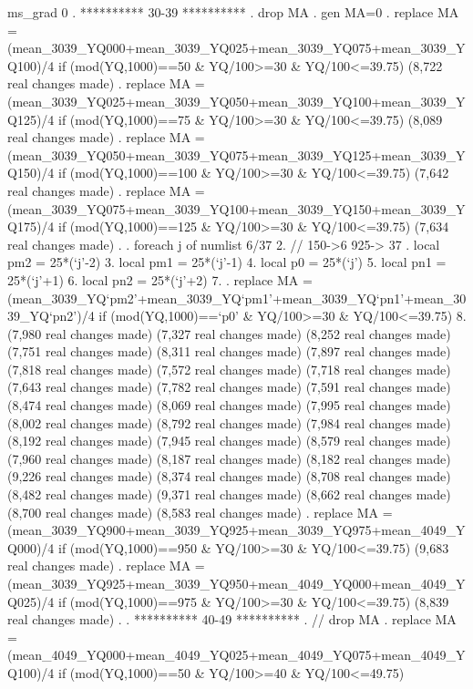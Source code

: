      ms_grad {\VBAR}          0
{\smallskip}
. **********  30-39 **********
. drop MA
{\smallskip}
. gen MA=0
{\smallskip}
. replace MA = (mean_3039_YQ000+mean_3039_YQ025+mean_3039_YQ075+mean_3039_YQ100)/4 if (mod(YQ,1000)==50 \& YQ/100>=30 \& YQ/100<=39.75)
(8,722 real changes made)
{\smallskip}
. replace MA = (mean_3039_YQ025+mean_3039_YQ050+mean_3039_YQ100+mean_3039_YQ125)/4 if (mod(YQ,1000)==75 \& YQ/100>=30 \& YQ/100<=39.75)
(8,089 real changes made)
{\smallskip}
. replace MA = (mean_3039_YQ050+mean_3039_YQ075+mean_3039_YQ125+mean_3039_YQ150)/4 if (mod(YQ,1000)==100 \& YQ/100>=30 \& YQ/100<=39.75)
(7,642 real changes made)
{\smallskip}
. replace MA = (mean_3039_YQ075+mean_3039_YQ100+mean_3039_YQ150+mean_3039_YQ175)/4 if (mod(YQ,1000)==125 \& YQ/100>=30 \& YQ/100<=39.75)
(7,634 real changes made)
{\smallskip}
. 
. foreach j of numlist 6/37{\lbr}
  2.         // 150->6 925-> 37
.         local pm2 = 25*(`j'-2)
  3.         local pm1 = 25*(`j'-1)
  4.         local p0 = 25*(`j')
  5.         local pn1 = 25*(`j'+1)
  6.         local pn2 = 25*(`j'+2)
  7. 
.         replace MA = (mean_3039_YQ`pm2'+mean_3039_YQ`pm1'+mean_3039_YQ`pn1'+mean_3039_YQ`pn2')/4 if (mod(YQ,1000)==`p0' \& YQ/100>=30 \& YQ/100<=39.75)
  8. {\rbr}
(7,980 real changes made)
(7,327 real changes made)
(8,252 real changes made)
(7,751 real changes made)
(8,311 real changes made)
(7,897 real changes made)
(7,818 real changes made)
(7,572 real changes made)
(7,718 real changes made)
(7,643 real changes made)
(7,782 real changes made)
(7,591 real changes made)
(8,474 real changes made)
(8,069 real changes made)
(7,995 real changes made)
(8,002 real changes made)
(8,792 real changes made)
(7,984 real changes made)
(8,192 real changes made)
(7,945 real changes made)
(8,579 real changes made)
(7,960 real changes made)
(8,187 real changes made)
(8,182 real changes made)
(9,226 real changes made)
(8,374 real changes made)
(8,708 real changes made)
(8,482 real changes made)
(9,371 real changes made)
(8,662 real changes made)
(8,700 real changes made)
(8,583 real changes made)
{\smallskip}
. replace MA = (mean_3039_YQ900+mean_3039_YQ925+mean_3039_YQ975+mean_4049_YQ000)/4 if (mod(YQ,1000)==950 \& YQ/100>=30 \& YQ/100<=39.75)
(9,683 real changes made)
{\smallskip}
. replace MA = (mean_3039_YQ925+mean_3039_YQ950+mean_4049_YQ000+mean_4049_YQ025)/4 if (mod(YQ,1000)==975 \& YQ/100>=30 \& YQ/100<=39.75)
(8,839 real changes made)
{\smallskip}
. 
. **********  40-49 **********
. // drop MA
. replace MA = (mean_4049_YQ000+mean_4049_YQ025+mean_4049_YQ075+mean_4049_YQ100)/4 if (mod(YQ,1000)==50 \& YQ/100>=40 \& YQ/100<=49.75)
